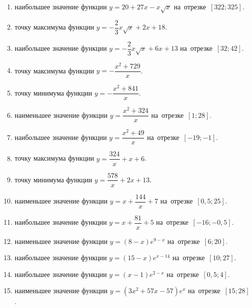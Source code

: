 \documentclass[a4paper,10pt]{article}
\begin{document}
\begin{enumerate}
\item {} наибольшее значение функции $y=20+27x -x\sqrt{x}$ на~отрезке~$\left[322;325\right]$.

\item {} точку максимума функции $y=-\dfrac{2}{3}x\sqrt{x} +2x+18$.

\item {} наибольшее значение функции $y=-\dfrac{2}{3}x\sqrt{x} +6x+13$ на~отрезке~$\left[32;42\right]$.

\item {} точку максимума функции $y=-\dfrac{x^2 +729}{x}$.

\item {} точку минимума функции $y=-\dfrac{x^2 +841}{x}$.

\item {} наименьшее значение функции $y=\dfrac{x^2 +324}{x}$ на~отрезке~$\left[1;28\right]$.

\item {} наибольшее значение функции $y=\dfrac{x^2 +49}{x}$ на~отрезке~$\left[-19;-1\right]$.

\item {} точку максимума функции $y=\dfrac{324}{x} +x+6$.

\item {} точку минимума функции $y=\dfrac{578}{x} +2x+13$.

\item {} наименьшее значение функции $y=x+\dfrac{144}{x} +7$ на~отрезке~$\left[0,5;25\right]$.

\item {} наибольшее значение функции $y=x+\dfrac{81}{x} +5$ на~отрезке~$\left[-16;-0,5\right]$.

\item {} наименьшее значение функции $y=\left(8-x\right)e^{9-x}$ на~отрезке~$\left[6;20\right]$.

\item {} наибольшее значение функции $y=\left(15-x\right)e^{x-14}$ на~отрезке~$\left[10;27\right]$.

\item {} наибольшее значение функции $y=\left(x-1\right)e^{2-x}$ на~отрезке~$\left[0,5;4\right]$.

\item {} наименьшее значение функции $y=\left(3x^2 +57x -57\right)e^{x }$ на~отрезке~$\left[15;28\right]$.


\end{enumerate}
\end{document}

